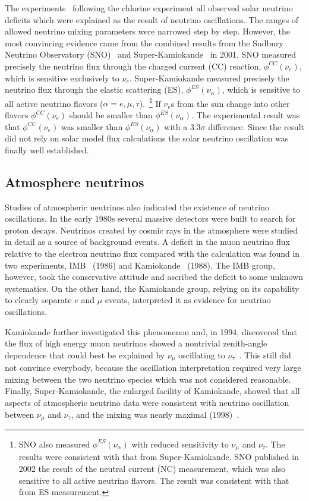 The experiments~\cite{Hir89,Aba91,Ans92} following the chlorine experiment all observed solar neutrino deficits which were explained as the result of neutrino oscillations. The ranges of allowed neutrino mixing parameters were narrowed step by step. However, the most convincing evidence came from the combined results from the Sudbury Neutrino Observatory (SNO)~\cite{Ahm01} and Super-Kamiokande~\cite{Fuk01} in 2001. SNO measured precisely the neutrino flux through the charged current (CC) reaction, $\phi^{CC}(\nu_e)$, which is sensitive exclusively to $\nu_e$. Super-Kamiokande measured precisely the neutrino flux through the elastic scattering (ES), $\phi^{ES}(\nu_\alpha)$, which is sensitive to all active neutrino flavors ($\alpha = e, \mu, \tau$).~\footnote{SNO also measured $\phi^{ES}(\nu_\alpha)$ with reduced sensitivity to $\nu_{\mu}$ and $\nu_{\tau}$. The results were consistent with that from Super-Kamiokande. SNO published in 2002 the result of the neutral current (NC) measurement, which was also sensitive to all active neutrino flavors. The result was consistent with that from ES measurement.} If $\nu_e$s from the sun change into other flavors $\phi^{CC}(\nu_e)$ should be smaller than $\phi^{ES}(\nu_\alpha)$. The experimental result was that $\phi^{CC}(\nu_e)$ was smaller than $\phi^{ES}(\nu_\alpha)$ with a $3.3\sigma$ difference. Since the result did not rely on solar model flux calculations the solar neutrino oscillation was finally well established.


\subsection{Atmosphere neutrinos}
\label{sec:atmo}
Studies of atmospheric neutrinos also indicated the existence of neutrino oscillations. In the early 1980s several massive detectors were built to search for proton decays. Neutrinos created by cosmic rays in the atmosphere were studied in detail as a source of background events. A deficit in the muon neutrino flux relative to the electron neutrino flux compared with the calculation was found in two experiments, IMB~\cite{Hai86} (1986) and Kamiokande~\cite{Hir88} (1988). The IMB group, however, took the conservative attitude and ascribed the deficit to some unknown systematics. On the other hand, the Kamiokande group, relying on its capability to clearly separate $e$ and $\mu$ events, interpreted it as evidence for neutrino oscillations.

Kamiokande further investigated this phenomenon and, in 1994, discovered that the flux of high energy muon neutrinos showed a nontrivial zenith-angle dependence that could best be explained by $\nu_\mu$ oscillating to $\nu_\tau$~\cite{Fuk94}. This still did not convince everybody, because the oscillation interpretation required very large mixing between the two neutrino species which was not considered reasonable. Finally, Super-Kamiokande, the enlarged facility of Kamiokande, showed that all aspects of atmospheric neutrino data were consistent with neutrino oscillation between $\nu_\mu$ and $\nu_\tau$, and the mixing was nearly maximal (1998)~\cite{Fuk98}.

